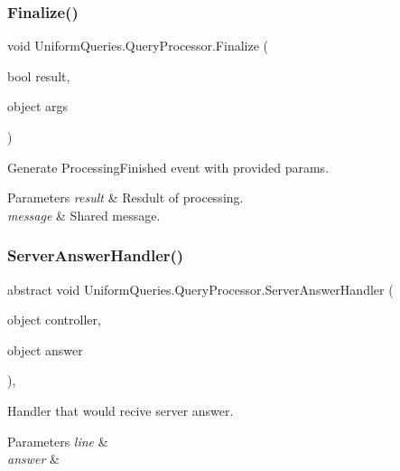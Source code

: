 \subsubsection{\texorpdfstring{Finalize()}{Finalize()}}
{\footnotesize\ttfamily void Uniform\+Queries.\+Query\+Processor.\+Finalize (\begin{DoxyParamCaption}\item[{bool}]{result,  }\item[{object}]{args }\end{DoxyParamCaption})\hspace{0.3cm}{\ttfamily [protected]}}



Generate Processing\+Finished event with provided params. 


\begin{DoxyParams}{Parameters}
{\em result} & Resdult of processing.\\
\hline
{\em message} & Shared message.\\
\hline
\end{DoxyParams}
\mbox{\label{class_uniform_queries_1_1_query_processor_ac0726166f2db4a9063024e4db190bd82}} 
\subsubsection{\texorpdfstring{Server\+Answer\+Handler()}{ServerAnswerHandler()}}
{\footnotesize\ttfamily abstract void Uniform\+Queries.\+Query\+Processor.\+Server\+Answer\+Handler (\begin{DoxyParamCaption}\item[{object}]{controller,  }\item[{object}]{answer }\end{DoxyParamCaption})\hspace{0.3cm}{\ttfamily [protected]}, {}}



Handler that would recive server answer. 


\begin{DoxyParams}{Parameters}
{\em line} & \\
\hline
{\em answer} & \\
\hline
\end{DoxyParams}


